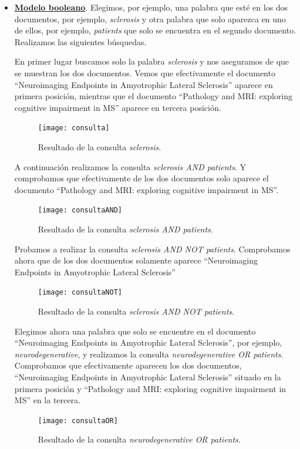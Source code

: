 \documentclass[size=a4, parskip=half, titlepage=false, toc=flat, toc=bib, 12pt, twoside]{scrartcl}
\theoremstyle{theorem-style}
\theoremstyle{definition-style}
\theoremstyle{remark-style}
\theoremstyle{example-style}
\theoremstyle{definition-style}
\theoremstyle{remark-style}
\begin{document}
\begin{itemize}
\item \textbf{\underline{Modelo booleano}}. Elegimos, por ejemplo, una palabra que esté en los dos documentos, por ejemplo, \textit{sclerosis} y otra palabra que solo aparezca en uno de ellos, por ejemplo, \textit{patients} que solo se encuentra en el segundo documento. Realizamos las siguientes búsquedas.

En primer lugar buscamos solo la palabra \textit{sclerosis} y nos aseguramos de que se muestran los dos documentos. Vemos que efectivamente el documento ``Neuroimaging Endpoints in Amyotrophic Lateral Sclerosis'' aparece en primera posición, mientras que el documento ``Pathology and MRI: exploring cognitive impairment in MS'' aparece en tercera posición.

\begin{figure}[H]
\centering
\texttt{[image: consulta]}
\caption{Resultado de la consulta \textit{sclerosis}.}
\label{errorcomillas}
\end{figure}
A continuación realizamos la consulta \textit{sclerosis AND patients}. Y comprobamos que efectivamente de los dos documentos solo aparece el documento ``Pathology and MRI: exploring cognitive impairment in MS''.
\begin{figure}[H]
\centering
\texttt{[image: consultaAND]}
\caption{Resultado de la consulta \textit{sclerosis AND patients}.}
\label{errorcomillas}
\end{figure}

Probamos a realizar la consulta \textit{sclerosis AND NOT patients}. Comprobamos ahora que de los dos documentos solamente aparece ``Neuroimaging Endpoints in Amyotrophic Lateral Sclerosis''

\begin{figure}[H]
\centering
\texttt{[image: consultaNOT]}
\caption{Resultado de la consulta \textit{sclerosis AND NOT patients}.}
\label{errorcomillas}
\end{figure}

Elegimos ahora una palabra que solo se encuentre en el documento ``Neuroimaging Endpoints in Amyotrophic Lateral Sclerosis'', por ejemplo, \textit{neurodegenerative}, y realizamos la consulta \textit{neurodegenerative OR patients}. Comprobamos que efectivamente aparecen los dos documentos, ``Neuroimaging Endpoints in Amyotrophic Lateral Sclerosis'' situado en la primera posición y ``Pathology and MRI: exploring cognitive impairment in MS'' en la tercera.

\begin{figure}[H]
\centering
\texttt{[image: consultaOR]}
\caption{Resultado de la consulta \textit{neurodegenerative OR patients}.}
\label{errorcomillas}
\end{figure}


\end{itemize}
\end{document}
